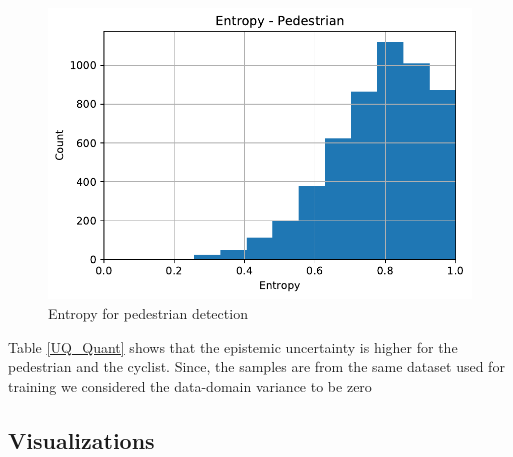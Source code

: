 \documentclass[10pt,twocolumn,letterpaper]{article}
\begin{document}
\begin{figure}[!htbp]
        \centering
		\includegraphics[scale = 0.4]{images/Part-Bayesian F_Pointnet_Results/Entropy_Pedestrian.pdf}
        \caption[Extracted frustum point cloud after Normalization]{Entropy for pedestrian detection}
        \label{fig:Norm Point Cloud}
\end{figure}
Table \ref{UQ_Quant} shows that the epistemic uncertainty is higher for the pedestrian and the cyclist. Since, the samples are from the same dataset used for training we considered the data-domain variance to be zero
\subsection{Visualizations}
\end{document}
